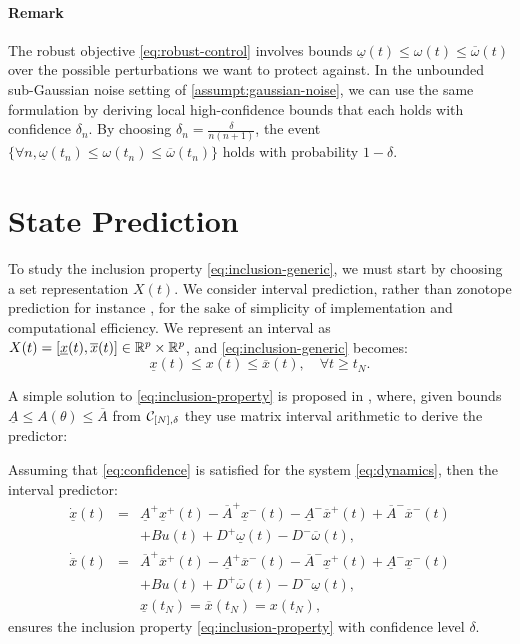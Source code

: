 \documentclass{article}
\begin{document}
\paragraph{Remark} The robust objective \eqref{eq:robust-control} involves bounds $\underline{\omega}(t)\leq \omega(t) \leq \overline{\omega}(t)$ over the possible perturbations we want to protect against. In the unbounded sub-Gaussian noise setting of \autoref{assumpt:gaussian-noise}, we can use the same formulation by deriving local high-confidence bounds that each holds with confidence $\delta_n$. By choosing $\delta_n = \frac{\delta}{n(n+1)}$, the event $\{\forall n, \underline{\omega}(t_n) \leq \omega(t_n) \leq \overline{\omega}(t_n)\}$ holds with probability $1-\delta$.

\section{State Prediction}

\label{sec:prediction}

To study the inclusion property \eqref{eq:inclusion-generic}, we must start by choosing a set representation $X(t)$. We consider interval prediction, rather than zonotope prediction for instance \citep[e.g.][]{le2012}, for the sake of simplicity of implementation and computational efficiency. We represent an interval as $X(t) = [\underline{x}(t), \overline{x}(t)]\in \mathbb{R}^p\times \mathbb{R}^p$, and \eqref{eq:inclusion-generic} becomes:
\begin{equation}
\label{eq:inclusion-property}
\underline{x}(t)\leq x(t)\leq\overline{x}(t),\quad\forall t\geq t_N.
\end{equation} 

A simple solution to \eqref{eq:inclusion-property} is proposed in \citep{Efimov2012}, where, given bounds $\underline{A}\leq A(\theta)\leq\overline{A}$ from $\mathcal{C}_{[N],\delta}$ they use matrix interval arithmetic to derive the predictor:
\begin{proposition}
Assuming that \eqref{eq:confidence} is satisfied for the system \eqref{eq:dynamics}, then the interval predictor:
\begin{eqnarray}
\dot{\underline{x}}(t) & = & \underline{A}^{+}\underline{x}^{+}(t)-\overline{A}^{+}\underline{x}^{-}(t)-\underline{A}^{-}\overline{x}^{+}(t) +\overline{A}^{-}\overline{x}^{-}(t)\nonumber \\
 &  &+Bu(t) + D^{+}\underline{\omega}(t)-D^{-}\overline{\omega}(t),\label{eq:predictor-naive}\\
\dot{\overline{x}}(t) & = & \overline{A}^{+}\overline{x}^{+}(t)-\underline{A}^{+}\overline{x}^{-}(t)-\overline{A}^{-}\underline{x}^{+}(t)+\underline{A}^{-}\underline{x}^{-}(t)\nonumber \\
 &  &+Bu(t) + D^{+}\overline{\omega}(t)-D^{-}\underline{\omega}(t),\nonumber \\
 &  & \underline{x}(t_N)=\overline{x}(t_N)={x}(t_N),\nonumber 
\end{eqnarray}
ensures the inclusion property \eqref{eq:inclusion-property} with confidence level $\delta$.
\end{proposition}
\end{document}
